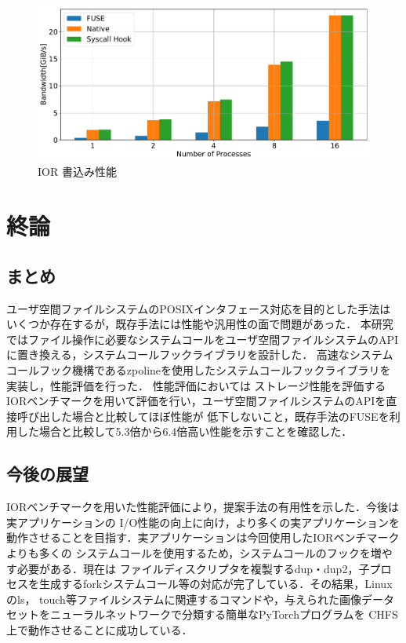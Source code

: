 \documentclass[a4paper，11pt]{jreport}
\begin{document}
\begin{figure}[h]
    \begin{minipage}[b]{1\columnwidth}
		\centering
		\includegraphics[width=0.9\linewidth]{./figure/ior_benchmark_write_v2.pdf}
		\caption{IOR 書込み性能}
		\label{fig:Evaluation write}
	\end{minipage}
\end{figure}

\chapter{終論}
\section{まとめ}
ユーザ空間ファイルシステムのPOSIXインタフェース対応を目的とした手法はいくつか存在するが，既存手法には性能や汎用性の面で問題があった．
本研究ではファイル操作に必要なシステムコールをユーザ空間ファイルシステムのAPIに置き換える，システムコールフックライブラリを設計した．
高速なシステムコールフック機構であるzpolineを使用したシステムコールフックライブラリを実装し，性能評価を行った．
性能評価においては
ストレージ性能を評価するIORベンチマークを用いて評価を行い，ユーザ空間ファイルシステムのAPIを直接呼び出した場合と比較してほぼ性能が
低下しないこと，既存手法のFUSEを利用した場合と比較して5.3倍から6.4倍高い性能を示すことを確認した．

\section{今後の展望}
IORベンチマークを用いた性能評価により，提案手法の有用性を示した．今後は実アプリケーションの
I/O性能の向上に向け，より多くの実アプリケーションを動作させることを目指す．実アプリケーションは今回使用したIORベンチマークよりも多くの
システムコールを使用するため，システムコールのフックを増やす必要がある．現在は
ファイルディスクリプタを複製するdup・dup2，子プロセスを生成するforkシステムコール等の対応が完了している．その結果，Linuxのls，
touch等ファイルシステムに関連するコマンドや，与えられた画像データセットをニューラルネットワークで分類する簡単なPyTorchプログラムを
CHFS上で動作させることに成功している．
\end{document}

